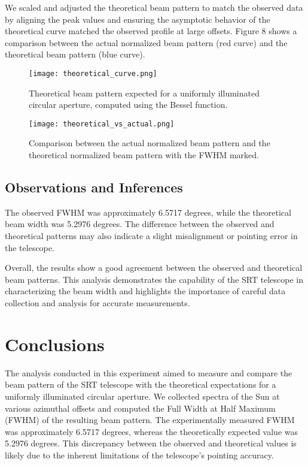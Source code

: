 \documentclass[linenumbers,twocolumn]{aastex631}
\begin{document}
We scaled and adjusted the theoretical beam pattern to match the observed data by aligning the peak values and ensuring the asymptotic behavior of the theoretical curve matched the observed profile at large offsets. Figure 8 shows a comparison between the actual normalized beam pattern (red curve) and the theoretical beam pattern (blue curve).

\begin{figure}[h]
    \centering
    \texttt{[image: theoretical\_curve.png]}
    \caption{Theoretical beam pattern expected for a uniformly illuminated circular aperture, computed using the Bessel function.}
    \label{fig:theoretical_bessel_func}
\end{figure}

\begin{figure}[h]
    \centering
    \texttt{[image: theoretical\_vs\_actual.png]}
    \caption{Comparison between the actual normalized beam pattern and the theoretical normalized beam pattern with the FWHM marked.}
    \label{fig:theoretical_vs_actual}
\end{figure}

\subsection{Observations and Inferences}
The observed FWHM was approximately 6.5717 degrees, while the theoretical beam width was 5.2976 degrees. The difference between the observed and theoretical patterns may also indicate a slight misalignment or pointing error in the telescope.

Overall, the results show a good agreement between the observed and theoretical beam patterns. This analysis demonstrates the capability of the SRT telescope in characterizing the beam width and highlights the importance of careful data collection and analysis for accurate measurements.

\section{Conclusions}

The analysis conducted in this experiment aimed to measure and compare the beam pattern of the SRT telescope with the theoretical expectations for a uniformly illuminated circular aperture. We collected spectra of the Sun at various azimuthal offsets and computed the Full Width at Half Maximum (FWHM) of the resulting beam pattern. The experimentally measured FWHM was approximately 6.5717 degrees, whereas the theoretically expected value was 5.2976 degrees. This discrepancy between the observed and theoretical values is likely due to the inherent limitations of the telescope's pointing accuracy.
\end{document}
